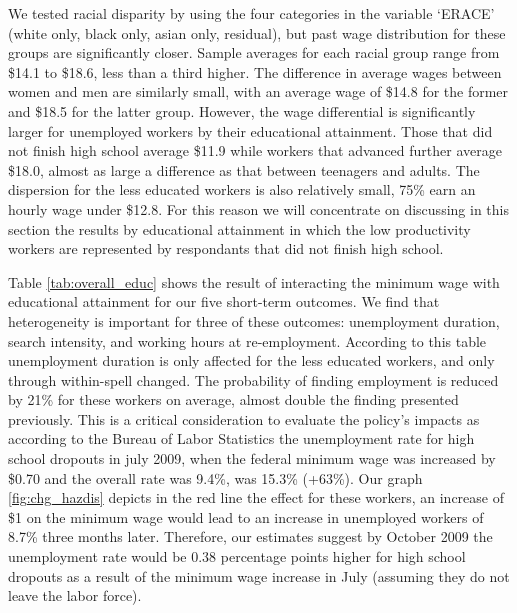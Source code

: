 \documentclass{article}
\begin{document}
We tested racial disparity by using the four categories in the variable `ERACE' (white only, black only, asian only, residual), but past wage distribution for these groups are significantly closer. Sample averages for each racial group range from \$14.1 to \$18.6, less than a third higher. The difference in average wages between women and men are similarly small, with an average wage of \$14.8 for the former and \$18.5 for the latter group. However, the wage differential is significantly larger for unemployed workers by their educational attainment. Those that did not finish high school average \$11.9 while workers that advanced further average \$18.0, almost as large a difference as that between teenagers and adults. The dispersion for the less educated workers is also relatively small, 75\% earn an hourly wage under \$12.8. For this reason we will concentrate on discussing in this section the results by educational attainment in which the low productivity workers are represented by respondants that did not finish high school.

Table \ref{tab:overall_educ} shows the result of interacting the minimum wage with educational attainment for our five short-term outcomes. We find that heterogeneity is important for three of these outcomes: unemployment duration, search intensity, and working hours at re-employment. According to this table unemployment duration is only affected for the less educated workers, and only through within-spell changed. The probability of finding employment is reduced by 21\% for these workers on average, almost double the finding presented previously. This is a critical consideration to evaluate the policy's impacts as according to the Bureau of Labor Statistics the unemployment rate for high school dropouts in july 2009, when the federal minimum wage was increased by \$0.70 and the overall rate was 9.4\%, was 15.3\% (+63\%). Our graph \ref{fig:chg_hazdis} depicts in the red line the effect for these workers, an increase of \$1 on the minimum wage would lead to an increase in unemployed workers of 8.7\% three months later. Therefore, our estimates suggest by October 2009 the unemployment rate would be 0.38 percentage points higher for high school dropouts as a result of the minimum wage increase in July (assuming they do not leave the labor force).
\end{document}
